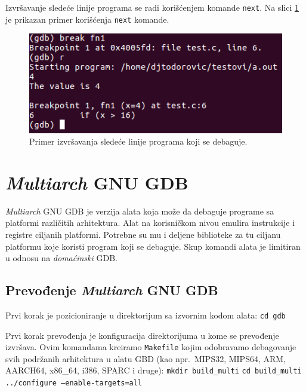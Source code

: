 \documentclass[12pt,oneside]{memoir}
\begin{document}
Izvršavanje sledeće linije programa se radi korišćenjem komande \texttt{next}. Na slici \ref{fig:next} je prikazan primer korišćenja \texttt{next} komande.

\begin{figure}[h!]
	\begin{center}
		\includegraphics[scale=0.5]{slike/break-fn.png}
	\end{center}
	\caption{Primer izvršavanja sledeće linije programa koji se debaguje.}
	\label{fig:next}
\end{figure}

\newpage
\section{\emph{Multiarch} GNU GDB}

\emph{Multiarch} GNU GDB je verzija alata koja može da debaguje programe sa platformi različitih arhitektura. Alat na korisničkom nivou emulira instrukcije i registre ciljanih platformi. Potrebne su mu i deljene biblioteke za tu ciljanu platformu koje koristi program koji se debaguje. Skup komandi alata je limitiran u odnosu na \emph{domaćinski} GDB.

\subsection{Prevođenje \emph{Multiarch} GNU GDB}

Prvi korak je pozicioniranje u direktorijum sa izvornim kodom alata:
\newline
\texttt{cd gdb}

Prvi korak prevođenja je konfiguracija direktorijuma u kome se prevođenje izvršava. Ovim komandama kreiramo \texttt{Makefile} kojim odobravamo debagovanje svih podržanih arhitektura u alatu GBD (kao npr.~MIPS32, MIPS64, ARM, AARCH64, x86\_64, i386, SPARC i druge):
\newline
\texttt{mkdir build\_multi}
\newline
\texttt{cd build\_multi}
\newline
\texttt{../configure --enable-targets=all}
\end{document}
